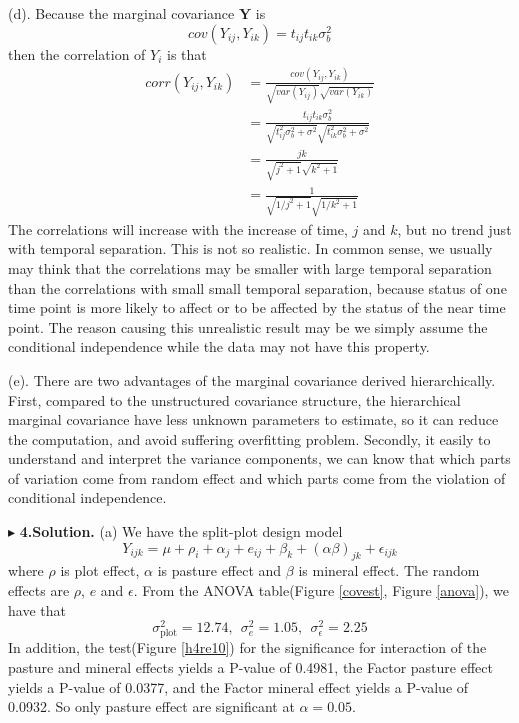 \documentclass[letterpaper, 12pt]{article}
\newcommand{\ba}{$$\begin{aligned}}
\newcommand{\ea}{\end{aligned}$$}
\begin{document}
(d). Because the marginal covariance $\bm{Y}$ is
$$
cov(Y_{ij},Y_{ik})=t_{ij}t_{ik}\sigma_b^2
$$
then the correlation of $Y_i$ is that 
\ba
corr(Y_{ij},Y_{ik})&=\frac{cov(Y_{ij},Y_{ik})}{\sqrt{var(Y_{ij})}\sqrt{var(Y_{ik})}}\\
&=\frac{t_{ij}t_{ik}\sigma_b^2}{\sqrt{t_{ij}^2\sigma_b^2+\sigma^2}\sqrt{t_{ik}^2\sigma_b^2+\sigma^2}}\\
&=\frac{jk}{\sqrt{j^2+1}\sqrt{k^2+1}}\\
&=\frac{1}{\sqrt{1/j^2+1}\sqrt{1/k^2+1}}
\ea
The correlations will increase with the increase of time, $j$ and $k$, but no trend just with temporal separation. This is not so realistic. In common sense, we usually may think that the correlations may be smaller with large temporal separation than the correlations with small small temporal separation, because status of one time point is more likely to affect or to be affected by the status of the near time point. The reason causing this unrealistic result may be we simply assume the conditional independence while the data may not have this property.

(e). There are two advantages of the marginal covariance derived hierarchically. First, compared to the unstructured covariance structure, the hierarchical marginal covariance have less unknown parameters to estimate, so it can reduce the computation, and avoid suffering overfitting problem. Secondly, it easily to understand and interpret the variance components, we can know that which parts of variation come from random effect and which parts come from the violation of conditional independence.




$\blacktriangleright$ \textbf{4.\quad Solution.} 
(a) We have the split-plot design model
$$
Y_{ijk}=\mu+\rho_i+\alpha_j+e_{ij}+\beta_k+(\alpha\beta)_{jk}+\epsilon_{ijk}
$$
where $\rho$ is plot effect, $\alpha$ is pasture effect and $\beta$ is mineral effect. The random effects are $\rho$, $e$ and $\epsilon$. From the ANOVA table(Figure \ref{covest}, Figure \ref{anova}), we have that
$$
\sigma_{\text{plot}}^2=12.74,\ \ \sigma^2_{e}=1.05,\ \ \sigma_\epsilon^2=2.25
$$
In addition, the test(Figure \ref{h4re10}) for the significance for interaction of the pasture and mineral effects yields a P-value of 0.4981, the Factor pasture effect yields a P-value of 0.0377, and the Factor mineral effect yields a P-value of 0.0932. So only pasture effect are significant at $\alpha=0.05$.
\end{document}
